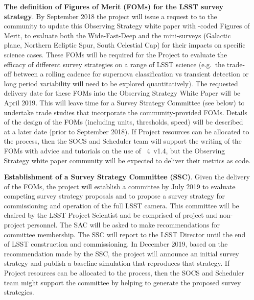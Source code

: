 \begin{description}
\item \textbf{The definition of Figures of Merit (FOMs) for the LSST
survey strategy}. By September 2018 the project will issue a request to
to the community to update this Observing Strategy white paper with
\MAF-coded Figures of Merit, to evaluate both the Wide-Fast-Deep and the
mini-surveys (Galactic plane, Northern Ecliptic Spur, South Celestial
Cap) for their impacts on specific science cases. These FOMs will be
required for the Project to evaluate the efficacy of different survey
strategies on a range of LSST science (e.g.\ the trade-off between a
rolling cadence for supernova classification vs transient detection or
long period variability will need to be explored quantitatively). The
requested delivery date for these \MAF FOMs into the Observing Strategy
White Paper will be April 2019.  This will leave time for a Survey
Strategy Committee (see below) to undertake trade studies that
incorporate the community-provided FOMs. Details of the design of the
FOMs (including units, thresholds, speed) will be described at a later
date (prior to September 2018). If Project resources can be allocated to
the process, then the SOCS and Scheduler team will support the writing
of the FOMs with advice and tutorials on the use of \OpSim~4~v1.4, but
the Observing Strategy white paper community will be expected to deliver
their metrics as \MAF code.

\item \textbf{Establishment of a Survey Strategy Committee (SSC)}. Given
the delivery of the FOMs, the project will establish a committee by July
2019 to evaluate competing survey strategy proposals and to propose a
survey strategy for commissioning and operation of the full LSST camera.
This committee will be chaired by the LSST Project Scientist and be
comprised of project and non-project personnel. The SAC will be asked to
make recommendations for committee membership. The SSC will report to
the LSST Director until the end of LSST construction and commissioning.
In December 2019, based on the recommendation made by the SSC, the
project will announce an initial survey strategy and publish a baseline
simulation that reproduces that strategy. If Project resources can be
allocated to the process, then the SOCS and Scheduler team might support
the committee by helping to generate the proposed survey strategies.

\end{description}

